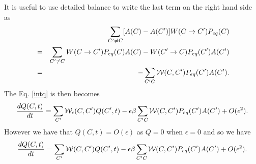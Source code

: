 \documentclass[11pt]{report}
\begin{document}
It is useful to use detailed balance to write the last term on the right hand side as
\begin{eqnarray}
&&\sum_{C'\neq C}[ A(C)-A(C')] W(C \to C')P_{eq}(C) \nonumber \\
&=&
 \sum_{C'\neq C}W(C \to C')P_{eq}(C) A(C)- W(C' \to C)P_{eq}(C')A(C')\nonumber \\
 &=& -\sum_{C' C} {\cal W}(C,C') P_{eq}(C')A(C').
\end{eqnarray}
The Eq. \eqref{intq} is then becomes
\begin{equation}
\frac{dQ(C,t)}{dt} = \sum_{C'} {\cal W}_\epsilon(C,C') Q(C',t) - \epsilon\beta \sum_{C' C} {\cal W}(C,C') P_{eq}(C')A(C')+ O(\epsilon^2).
\end{equation}
However we have that $Q(C,t)=O(\epsilon)$ as $Q=0$ when $\epsilon=0$ and so we have
\begin{equation}
\frac{dQ(C,t)}{dt} = \sum_{C'} {\cal W}(C,C') Q(C',t) - \epsilon\beta \sum_{C' C} {\cal W}(C,C') P_{eq}(C')A(C')+ O(\epsilon^2).
\end{equation}
\end{document}
